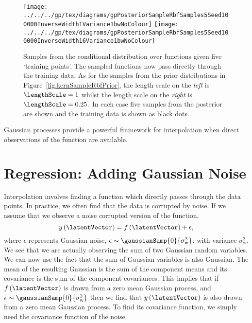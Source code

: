%
\begin{figure}[htb]
  \texttt{[image: ../../../gp/tex/diagrams/gpPosteriorSampleRbfSamples5Seed100000InverseWidth1Variance1bwNoColour]}\hfill
  \texttt{[image: ../../../gp/tex/diagrams/gpPosteriorSampleRbfSamples5Seed100000InverseWidth16Variance1bwNoColour]}

  \caption{Samples from the conditional distribution over functions
    given five `training points'. The sampled functions now pass
    directly through the training data. As for the samples from the
    prior distributions in Figure~\ref{fig:kernSampleRbfPrior}, the
    length scale on the \emph{left} is $\lengthScale=1$ whilst the
    length scale on the \emph{right} is $\lengthScale=0.25$. In each
    case five samples from the posterior are shown and the training
    data is shown as black dots.\label{fig:kernSampleRbfPosterior}}

\end{figure}

Gaussian processes provide a powerful framework for interpolation when
direct observations of the function are available.

\section{Regression: Adding Gaussian Noise}\label{sec:regressionWithNoise}


Interpolation involves finding a function which directly passes
through the data points. In practice, we often find that the data is
corrupted by noise. If we assume that we observe a noise corrupted
version of the function,
\[
y\left(\latentVector\right) = f\left(\latentVector\right) + \epsilon,
\]
where $\epsilon$ represents Gaussian noise, $\epsilon \sim
\gaussianSamp{0}{\sigma_{\mathrm{w}}^2}$, with variance
$\sigma^2_\mathrm{w}$. We see that we are actually observing the sum
of two Gaussian random variables. We can now use the fact that the sum
of Gaussian variables is also Gaussian. The mean of the resulting
Gaussian is the sum of the component means and its covariance is the
sum of the component covariances.  This implies that if
$f\left(\latentVector\right)$ is drawn from a zero mean Gaussian process,
and $\epsilon \sim \gaussianSamp{0}{\sigma_{\mathrm{w}}^2}$ then we
find that $y\left(\latentVector\right)$ is also drawn from a zero mean
Gaussian process. To find its covariance function, we simply need the
covariance function of the noise.

